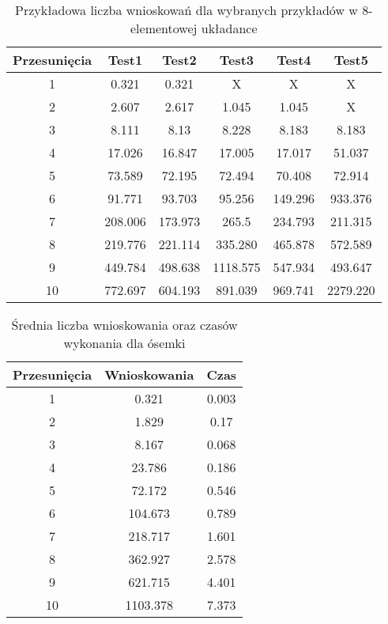         \begin{table}[H]
            \centering
             \begin{tabular}{||c | c | c | c | c | c |} 
             \hline
             Przesunięcia & Test1 & Test2 & Test3 & Test4 & Test5 \\ [0.5ex] 
             \hline\hline
             1 & 0.321 & 0.321 & X & X & X \\ 
             \hline
             2 & 2.607 & 2.617 & 1.045 & 1.045 & X \\
             \hline
             3 & 8.111 & 8.13 & 8.228 & 8.183 & 8.183 \\
             \hline
             4 & 17.026 & 16.847 & 17.005 & 17.017 & 51.037 \\
             \hline
             5 & 73.589 & 72.195 & 72.494 & 70.408 & 72.914  \\
             \hline
             6 & 91.771 & 93.703 & 95.256 & 149.296 & 933.376 \\ 
             \hline
             7 & 208.006 & 173.973 & 265.5 & 234.793 & 211.315 \\
             \hline
             8 & 219.776 & 221.114 & 335.280 & 465.878 & 572.589 \\
             \hline
             9 & 449.784 & 498.638 & 1118.575 & 547.934 & 493.647 \\
             \hline
             10 & 772.697 & 604.193 & 891.039 & 969.741 & 2279.220 \\ [1ex]
             \hline
             \end{tabular}
             \caption{Przykładowa liczba wnioskowań dla wybranych przykładów w 8-elementowej układance}
        \end{table}
    
        \begin{table}[H]
            \centering
             \begin{tabular}{||c | c | c|} 
             \hline
             Przesunięcia & Wnioskowania & Czas \\ [0.5ex] 
             \hline\hline
             1 & 0.321 & 0.003 \\ 
             \hline
             2 & 1.829 & 0.17 \\
             \hline
             3 & 8.167 &  0.068 \\
             \hline
             4 & 23.786 &  0.186 \\
             \hline
             5 & 72.172 &  0.546\\
             \hline
             6 & 104.673 &  0.789\\ 
             \hline
             7 & 218.717 &  1.601\\
             \hline
             8 & 362.927 &  2.578\\
             \hline
             9 & 621.715 &  4.401\\
             \hline
             10 & 1103.378 & 7.373\\ [1ex]
             \hline
             \end{tabular}
             \caption{Średnia liczba wnioskowania oraz czasów wykonania dla ósemki}
        \end{table}

